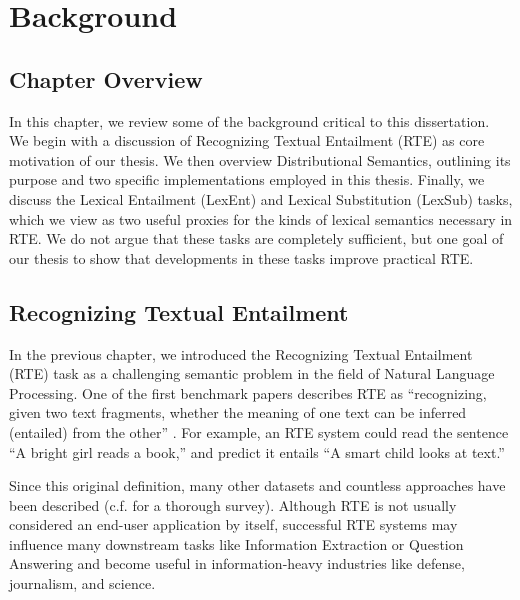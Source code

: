 \chapter{Background}
\label{ch:background}

\section{Chapter Overview}

In this chapter, we review some of the background critical to this dissertation.
We begin with a discussion of Recognizing Textual Entailment (RTE) as core
motivation of our thesis.  We then overview Distributional Semantics, outlining
its purpose and two specific implementations employed in this thesis. Finally,
we discuss the Lexical Entailment (LexEnt) and Lexical Substitution (LexSub)
tasks, which we view as two useful proxies for the kinds of lexical semantics
necessary in RTE. We do not argue that these tasks are completely sufficient,
but one goal of our thesis to show that developments in these tasks improve
practical RTE.

\section{Recognizing Textual Entailment}
\label{sec:textent}

In the previous chapter, we introduced the Recognizing Textual Entailment (RTE)
task as a challenging semantic problem in the field of
Natural Language Processing.  One of the first benchmark papers describes RTE
as ``recognizing, given two text fragments, whether the meaning of one text can
be inferred (entailed) from the other'' \cite{dagan:2006:mlc}. For example,
an RTE system could read the sentence ``A bright girl reads a book,'' and
predict it entails ``A smart child looks at text.''

Since this original definition, many other datasets
\cite{giampiccolo:2007:pascal,bentivogli:2009:tac,marelli:2014:semeval} and
countless approaches have been described (c.f. 
for a thorough survey). Although RTE is not usually considered an
end-user application by itself, successful RTE systems may influence many
downstream tasks like Information Extraction or Question Answering and become
useful in information-heavy industries like defense, journalism, and science.


